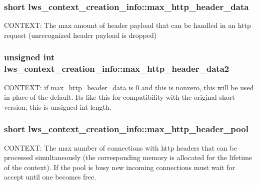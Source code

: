 \subsubsection[{\texorpdfstring{max\+\_\+http\+\_\+header\+\_\+data}{max\_http\_header\_data}}]{\setlength{\rightskip}{0pt plus 5cm}short lws\+\_\+context\+\_\+creation\+\_\+info\+::max\+\_\+http\+\_\+header\+\_\+data}\hypertarget{structlws__context__creation__info_a0cdfd3c484689ba6f0f2cc91b38ce948}{}\label{structlws__context__creation__info_a0cdfd3c484689ba6f0f2cc91b38ce948}
C\+O\+N\+T\+E\+XT\+: The max amount of header payload that can be handled in an http request (unrecognized header payload is dropped) 
\subsubsection[{\texorpdfstring{max\+\_\+http\+\_\+header\+\_\+data2}{max\_http\_header\_data2}}]{\setlength{\rightskip}{0pt plus 5cm}unsigned int lws\+\_\+context\+\_\+creation\+\_\+info\+::max\+\_\+http\+\_\+header\+\_\+data2}\hypertarget{structlws__context__creation__info_aa8d9e85e137f35fb006f2e4a53f0887a}{}\label{structlws__context__creation__info_aa8d9e85e137f35fb006f2e4a53f0887a}
C\+O\+N\+T\+E\+XT\+: if max\+\_\+http\+\_\+header\+\_\+data is 0 and this is nonzero, this will be used in place of the default. It\textquotesingle{}s like this for compatibility with the original short version, this is unsigned int length. 
\subsubsection[{\texorpdfstring{max\+\_\+http\+\_\+header\+\_\+pool}{max\_http\_header\_pool}}]{\setlength{\rightskip}{0pt plus 5cm}short lws\+\_\+context\+\_\+creation\+\_\+info\+::max\+\_\+http\+\_\+header\+\_\+pool}\hypertarget{structlws__context__creation__info_a0b154e79abc1167ba4ac3539f4af6720}{}\label{structlws__context__creation__info_a0b154e79abc1167ba4ac3539f4af6720}
C\+O\+N\+T\+E\+XT\+: The max number of connections with http headers that can be processed simultaneously (the corresponding memory is allocated for the lifetime of the context). If the pool is busy new incoming connections must wait for accept until one becomes free. 
